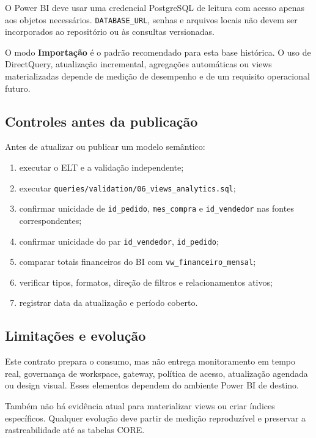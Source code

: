 \documentclass[12pt,a4paper]{article}
\providecommand{\tightlist}{
  \setlength{\itemsep}{0pt}\setlength{\parskip}{0pt}
}
\begin{document}
O Power BI deve usar uma credencial PostgreSQL de leitura com acesso
apenas aos objetos necessários. \nolinkurl{DATABASE_URL}, senhas e
arquivos locais não devem ser incorporados ao repositório ou às
consultas versionadas.

O modo \textbf{Importação} é o padrão recomendado para esta base
histórica. O uso de DirectQuery, atualização incremental, agregações
automáticas ou views materializadas depende de medição de desempenho e
de um requisito operacional futuro.

\subsection{Controles antes da
publicação}\label{docs__analytics__consumo_power_bi_sql.md__controles-antes-da-publicauxe7uxe3o}

Antes de atualizar ou publicar um modelo semântico:

\begin{enumerate}
\def\labelenumi{\arabic{enumi}.}
\tightlist
\item
  executar o ELT e a validação independente;
\item
  executar \nolinkurl{queries/validation/06_views_analytics.sql};
\item
  confirmar unicidade de \nolinkurl{id_pedido}, \nolinkurl{mes_compra} e
  \nolinkurl{id_vendedor} nas fontes correspondentes;
\item
  confirmar unicidade do par \nolinkurl{id_vendedor},
  \nolinkurl{id_pedido};
\item
  comparar totais financeiros do BI com
  \nolinkurl{vw_financeiro_mensal};
\item
  verificar tipos, formatos, direção de filtros e relacionamentos
  ativos;
\item
  registrar data da atualização e período coberto.
\end{enumerate}

\subsection{Limitações e
evolução}\label{docs__analytics__consumo_power_bi_sql.md__limitauxe7uxf5es-e-evoluuxe7uxe3o}

Este contrato prepara o consumo, mas não entrega monitoramento em tempo
real, governança de workspace, gateway, política de acesso, atualização
agendada ou design visual. Esses elementos dependem do ambiente Power BI
de destino.

Também não há evidência atual para materializar views ou criar índices
específicos. Qualquer evolução deve partir de medição reproduzível e
preservar a rastreabilidade até as tabelas CORE.
\end{document}
